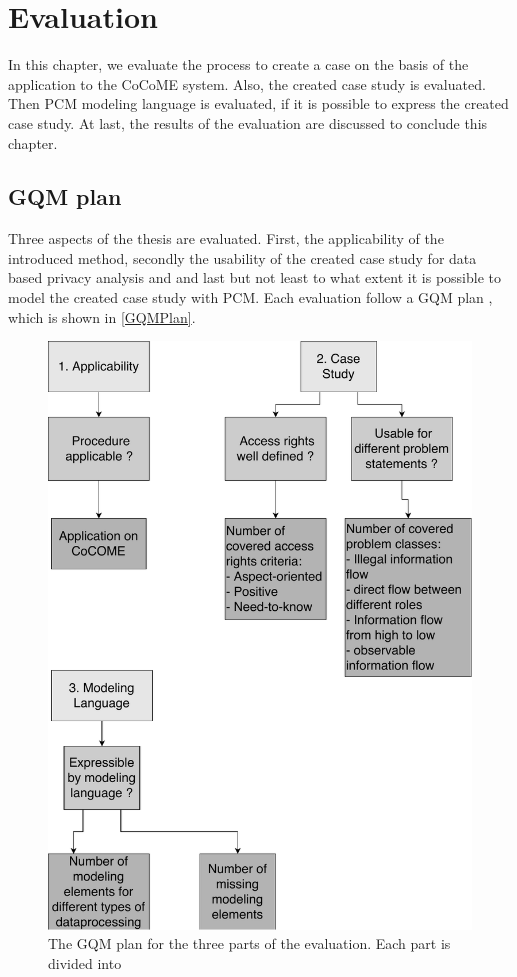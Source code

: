 
\chapter{Evaluation}
\label{ch:eval}
In this chapter, we evaluate the process to create a case on the basis of the application to the CoCoME system. Also, the created case study is evaluated. Then PCM modeling language is evaluated, if it is possible to express the created case study. At last, the results of the evaluation are discussed to conclude this chapter.
\section{GQM plan}
Three aspects of the thesis are evaluated. First, the applicability of the introduced method, secondly the usability of the created case study for data based privacy analysis and and last but not least to what extent it is possible to model the created case study with PCM. 
 Each evaluation follow a GQM plan \cite{GQM_Intro}, which is shown in \autoref{GQMPlan}. 
\begin{figure}
\includegraphics[scale=.8, origin=c ]{logos/OverviewEval.pdf}
\caption{The GQM plan for the three parts of the evaluation. Each part is divided into }
\label{GQMPlan}
\end{figure}
